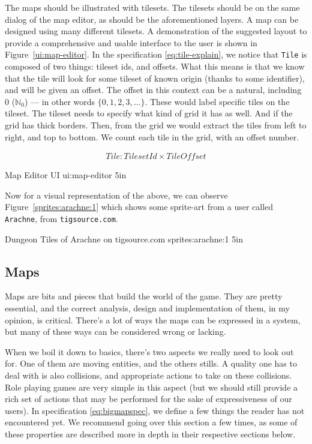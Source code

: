 The maps should be illustrated with tilesets. The tilesets should be on the
same dialog of the map editor, as should be the aforementioned layers. A map
can be designed using many different tilesets. A demonstration of the
suggested layout to provide a comprehensive and usable interface to the user
is shown in Figure~\ref{ui:map-editor}. In the specification
\ref{eq:tile-explain}, we notice that \texttt{Tile} is composed of two things:
tileset ids, and offsets. What this means is that we know that the tile will
look for some tileset of known origin (thanks to some identifier), and will be
given an offset. The offset in this context can be a natural, including 0
($\mathbb{N}_0$) --- in other words $\{ 0, 1, 2, 3, ... \}$. These would label
specific tiles on the tileset. The tileset needs to specify what kind of grid
it has as well. And if the grid has thick borders. Then, from the grid we would
extract the tiles from left to right, and top to bottom. We count each tile in
the grid, with an offset number.

\begin{equation}
  \begin{split} \label{eq:tile-explain}
  Tile\colon TilesetId \times TileOffset
\end{split}
\end{equation}

%
       {Map Editor UI}%
       {ui:map-editor}%
       {5in}

Now for a visual representation of the above, we can observe
Figure~\ref{sprites:arachne:1} which shows some sprite-art from a user called
\texttt{Arachne}, from \texttt{tigsource.com}.

%
       {Dungeon Tiles of Arachne on tigsource.com \cite{arachnesprite1}}%
       {sprites:arachne:1}%
       {5in}

\subsection{Maps}

Maps are bits and pieces that build the world of the game. They are pretty
essential, and the correct analysis, design and implementation of them, in my
opinion, is critical. There's a lot of ways the maps can be expressed in a
system, but many of these ways can be considered wrong or lacking.

When we boil it down to basics, there's two aspects we really need to look out
for. One of them are moving entities, and the others stills. A quality one has
to deal with is also collisions, and appropriate actions to take on these
collisions. Role playing games are very simple in this aspect (but we should
still provide a rich set of actions that may be performed for the sake of
expressiveness of our users). In specification \ref{eq:bigmapspec}, we define a
few things the reader has not encountered yet. We recommend going over this
section a few times, as some of these properties are described more in depth in
their respective sections below.

